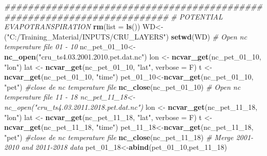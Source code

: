 \documentclass[
  10pt,
  b5paper,
]{book}
\newenvironment{Shaded}{\begin{snugshade}}{\end{snugshade}}
\newcommand{\CommentTok}[1]{\textcolor[rgb]{0.56,0.35,0.01}{\textit{#1}}}
\newcommand{\DataTypeTok}[1]{\textcolor[rgb]{0.13,0.29,0.53}{#1}}
\newcommand{\DecValTok}[1]{\textcolor[rgb]{0.00,0.00,0.81}{#1}}
\newcommand{\KeywordTok}[1]{\textcolor[rgb]{0.13,0.29,0.53}{\textbf{#1}}}
\newcommand{\NormalTok}[1]{#1}
\newcommand{\StringTok}[1]{\textcolor[rgb]{0.31,0.60,0.02}{#1}}
\begin{document}
\begin{Shaded}
\begin{Highlighting}[]
 \CommentTok{########################################################################}
 \CommentTok{# POTENTIAL EVAPOTRANSPIRATION }
 \KeywordTok{rm}\NormalTok{(}\DataTypeTok{list =} \KeywordTok{ls}\NormalTok{())}
\NormalTok{WD<-(}\StringTok{"C:/Training_Material/INPUTS/CRU_LAYERS"}\NormalTok{)}
\KeywordTok{setwd}\NormalTok{(WD)}
 \CommentTok{# Open nc temperature file 01 - 10}
\NormalTok{nc_pet_}\DecValTok{01}\NormalTok{_}\DecValTok{10}\NormalTok{<-}\KeywordTok{nc_open}\NormalTok{(}\StringTok{"cru_ts4.03.2001.2010.pet.dat.nc"}\NormalTok{)}
\NormalTok{ lon <-}\StringTok{ }\KeywordTok{ncvar_get}\NormalTok{(nc_pet_}\DecValTok{01}\NormalTok{_}\DecValTok{10}\NormalTok{, }\StringTok{"lon"}\NormalTok{)}
\NormalTok{lat <-}\StringTok{ }\KeywordTok{ncvar_get}\NormalTok{(nc_pet_}\DecValTok{01}\NormalTok{_}\DecValTok{10}\NormalTok{, }\StringTok{"lat"}\NormalTok{, }\DataTypeTok{verbose =}\NormalTok{ F)}
\NormalTok{t <-}\StringTok{ }\KeywordTok{ncvar_get}\NormalTok{(nc_pet_}\DecValTok{01}\NormalTok{_}\DecValTok{10}\NormalTok{, }\StringTok{"time"}\NormalTok{)}
\NormalTok{ pet_}\DecValTok{01}\NormalTok{_}\DecValTok{10}\NormalTok{<-}\KeywordTok{ncvar_get}\NormalTok{(nc_pet_}\DecValTok{01}\NormalTok{_}\DecValTok{10}\NormalTok{, }\StringTok{"pet"}\NormalTok{)}
 \CommentTok{#close de nc temperature file}
 \KeywordTok{nc_close}\NormalTok{(nc_pet_}\DecValTok{01}\NormalTok{_}\DecValTok{10}\NormalTok{) }
 \CommentTok{# Open nc temperature file 11 - 18 nc_pet_11_18<-nc_open("cru_ts4.03.2011.2018.pet.dat.nc")}
\NormalTok{ lon <-}\StringTok{ }\KeywordTok{ncvar_get}\NormalTok{(nc_pet_}\DecValTok{11}\NormalTok{_}\DecValTok{18}\NormalTok{, }\StringTok{"lon"}\NormalTok{)}
\NormalTok{lat <-}\StringTok{ }\KeywordTok{ncvar_get}\NormalTok{(nc_pet_}\DecValTok{11}\NormalTok{_}\DecValTok{18}\NormalTok{, }\StringTok{"lat"}\NormalTok{, }\DataTypeTok{verbose =}\NormalTok{ F)}
\NormalTok{t <-}\StringTok{ }\KeywordTok{ncvar_get}\NormalTok{(nc_pet_}\DecValTok{11}\NormalTok{_}\DecValTok{18}\NormalTok{, }\StringTok{"time"}\NormalTok{)}
\NormalTok{ pet_}\DecValTok{11}\NormalTok{_}\DecValTok{18}\NormalTok{<-}\KeywordTok{ncvar_get}\NormalTok{(nc_pet_}\DecValTok{11}\NormalTok{_}\DecValTok{18}\NormalTok{, }\StringTok{"pet"}\NormalTok{)}
 \CommentTok{#close de nc temperature file}
 \KeywordTok{nc_close}\NormalTok{(nc_pet_}\DecValTok{11}\NormalTok{_}\DecValTok{18}\NormalTok{) }
 \CommentTok{# Merge 2001-2010 and 2011-2018 data }
\NormalTok{ pet_}\DecValTok{01}\NormalTok{_}\DecValTok{18}\NormalTok{<-}\KeywordTok{abind}\NormalTok{(pet_}\DecValTok{01}\NormalTok{_}\DecValTok{10}\NormalTok{,pet_}\DecValTok{11}\NormalTok{_}\DecValTok{18}\NormalTok{)}

\end{Highlighting}
\end{Shaded}
\end{document}
